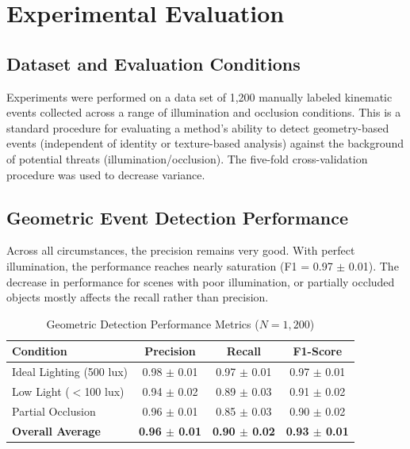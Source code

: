 \documentclass[conference]{IEEEtran}
\begin{document}
\section{Experimental Evaluation}

\subsection{Dataset and Evaluation Conditions}
Experiments were performed on a data set of 1,200 manually labeled kinematic events collected across a range of illumination and occlusion conditions. This is a standard procedure for evaluating a method’s ability to detect geometry-based events (independent of identity or texture-based analysis) against the background of potential threats (illumination/occlusion). The five-fold cross-validation procedure was used to decrease variance.

\subsection{Geometric Event Detection Performance}
Across all circumstances, the precision remains very good. With perfect illumination, the performance reaches nearly saturation (F1 = 0.97 $\pm$ 0.01). The decrease in performance for scenes with poor illumination, or partially occluded objects mostly affects the recall rather than precision.

\begin{table}[htbp]
\caption{Geometric Detection Performance Metrics ($N=1,200$)}
\begin{center}
\begin{tabular}{lccc}
\toprule
\textbf{Condition} & \textbf{Precision} & \textbf{Recall} & \textbf{F1-Score} \\
\midrule
Ideal Lighting (500 lux) & 0.98 $\pm$ 0.01 & 0.97 $\pm$ 0.01 & 0.97 $\pm$ 0.01 \\
Low Light ($<$100 lux) & 0.94 $\pm$ 0.02 & 0.89 $\pm$ 0.03 & 0.91 $\pm$ 0.02 \\
Partial Occlusion & 0.96 $\pm$ 0.01 & 0.85 $\pm$ 0.03 & 0.90 $\pm$ 0.02 \\
\midrule
\textbf{Overall Average} & \textbf{0.96 $\pm$ 0.01} & \textbf{0.90 $\pm$ 0.02} & \textbf{0.93 $\pm$ 0.01} \\
\bottomrule
\end{tabular}
\end{center}
\end{table}
\end{document}
